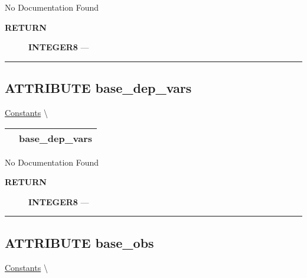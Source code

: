 No Documentation Found








\par
\begin{description}
\item [\colorbox{tagtype}{\color{white} \textbf{\textsf{RETURN}}}] \textbf{INTEGER8} --- 
\end{description}




\rule{\linewidth}{0.5pt}
\subsection*{\textsf{\colorbox{headtoc}{\color{white} ATTRIBUTE}
base\_dep\_vars}}

\hypertarget{ecldoc:constants.base_dep_vars}{}
\hspace{0pt} \hyperlink{ecldoc:Constants}{Constants} \textbackslash 

{\renewcommand{\arraystretch}{1.5}
\begin{tabularx}{\textwidth}{|>{\raggedright\arraybackslash}l|X|}
\hline
\hspace{0pt}\mytexttt{\color{red} } & \textbf{base\_dep\_vars} \\
\hline
\end{tabularx}
}

\par





No Documentation Found








\par
\begin{description}
\item [\colorbox{tagtype}{\color{white} \textbf{\textsf{RETURN}}}] \textbf{INTEGER8} --- 
\end{description}




\rule{\linewidth}{0.5pt}
\subsection*{\textsf{\colorbox{headtoc}{\color{white} ATTRIBUTE}
base\_obs}}

\hypertarget{ecldoc:constants.base_obs}{}
\hspace{0pt} \hyperlink{ecldoc:Constants}{Constants} \textbackslash 

